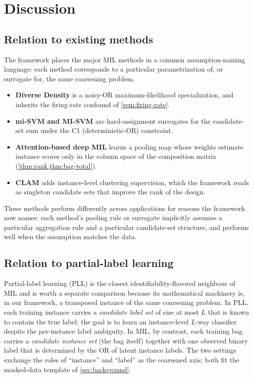 \section{Discussion}
\label{sec:discussion}

\subsection{Relation to existing methods}

The framework places the major MIL methods in a common
assumption-naming language: each method corresponds to a particular
parametrization of, or surrogate for, the same coarsening problem.
\begin{itemize}
\item \textbf{Diverse Density} \citep{maron1998framework} is a
  noisy-OR maximum-likelihood specialization, and inherits the
  firing-rate confound of \cref{rem:firing-rate}.
\item \textbf{mi-SVM and MI-SVM} \citep{andrews2003support} are
  hard-assignment surrogates for the candidate-set sum under the C1
  (deterministic-OR) constraint.
\item \textbf{Attention-based deep MIL} \citep{ilse2018attention}
  learns a pooling map whose weights estimate instance scores only
  in the column space of the composition matrix
  (\cref{thm:rank,thm:bag-total}).
\item \textbf{CLAM} \citep{lu2021data} adds instance-level
  clustering supervision, which the framework reads as singleton
  candidate sets that improve the rank of the design.
\end{itemize}
These methods perform differently across applications
\citep{carbonneau2018multiple} for reasons the framework now
names: each method's pooling rule or surrogate implicitly assumes a
particular aggregation rule and a particular candidate-set
structure, and performs well when the assumption matches the data.

\subsection{Relation to partial-label learning}

Partial-label learning (PLL) \citep{cour2011learning} is the closest
identifiability-flavored neighbour of MIL and is worth a separate
comparison because its mathematical machinery is, in our framework,
a transposed instance of the same coarsening problem. In PLL, each
training instance carries a \emph{candidate label set} of size at
most $L$ that is known to contain the true label; the goal is to
learn an instance-level $L$-way classifier despite the per-instance
label ambiguity. In MIL, by contrast, each training bag carries a
\emph{candidate instance set} (the bag itself) together with one
observed binary label that is determined by the OR of latent
instance labels. The two settings exchange the roles of ``instance''
and ``label'' as the coarsened axis; both fit the masked-data
template of \cref{sec:background}.

